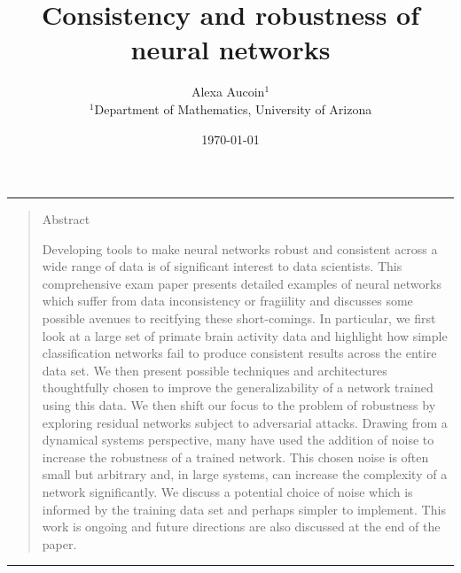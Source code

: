\documentclass[12pt]{article}
\title{Consistency and robustness of neural networks}
\author{Alexa Aucoin$^{1}$ \\ \normalsize{$^{1}$Department of Mathematics, University of Arizona}}
\date{\today}
\newenvironment{sciabstract}{%
\begin{quote} \bf}
{\end{quote}}
\begin{document}
\maketitle

\hrule
\begin{sciabstract}
\begin{center} \large{Abstract}\end{center}
Developing tools to make neural networks robust and consistent across a wide range of data is of significant interest to data scientists. This comprehensive exam paper presents detailed examples of neural networks which suffer from data inconsistency or fragiility and discusses some possible avenues to recitfying these short-comings. In particular, we first look at a large set of primate brain activity data and highlight how simple classification networks fail to produce consistent results across the entire data set. We then present possible techniques and architectures thoughtfully chosen to improve the generalizability of a network trained using this data. We then shift our focus to the problem of robustness by exploring residual networks subject to adversarial attacks. Drawing from a dynamical systems perspective, many have used the addition of noise to increase the robustness of a trained network. This chosen noise is often small but arbitrary and, in large systems, can increase the complexity of a network significantly. We discuss a potential choice of noise which is informed by the training data set and perhaps simpler to implement. This work is ongoing and future directions are also discussed at the end of the paper.
\end{sciabstract}
\hrule
\end{document}
